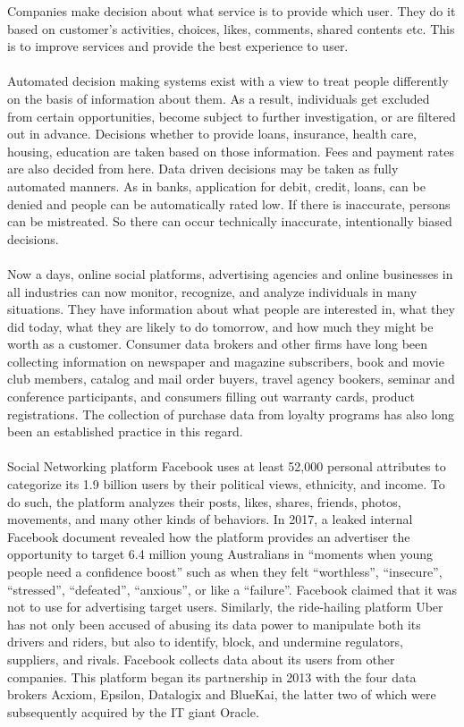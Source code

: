 \documentclass[12pt,a4paper,conference]{IEEEtran}
\begin{document}
Companies make decision about what service is to provide which user. They do it based on customer’s activities, choices, likes, comments, shared contents etc. This is to improve services and provide the best experience to user. \\
\\
Automated decision making systems exist with a view to treat people differently on the basis of information about them. As a result, individuals get excluded from certain opportunities, become subject to further investigation, or are filtered out in advance. Decisions whether to provide loans, insurance, health care, housing, education are taken based on those information. Fees and payment rates are also decided from here. \autocite{valentino2012websites} Data driven decisions may be taken as fully automated manners. As in banks, application for debit, credit, loans, can be denied and people can be automatically rated low. If there is inaccurate, persons can be mistreated. So there can occur technically inaccurate, intentionally biased decisions. \\
\\
Now a days, online social platforms, advertising agencies and online businesses in all industries can now monitor, recognize, and analyze individuals in many situations. They have information about what people are interested in, what they did today, what they are likely to do tomorrow, and how much they might be worth as a customer. Consumer data brokers and other firms have long been collecting information on newspaper and magazine subscribers, book and movie club members, catalog and mail order buyers, travel agency bookers, seminar and conference participants, and consumers filling out warranty cards, product registrations. The collection of purchase data from loyalty programs has also long been an established practice in this regard. \\
\\
Social Networking platform Facebook uses at least 52,000 personal attributes to categorize its 1.9 billion users by their political views, ethnicity, and income. To do such, the platform analyzes their posts, likes, shares, friends, photos, movements, and many other kinds of behaviors. In 2017, a leaked internal Facebook document revealed how the platform provides an advertiser the opportunity to target 6.4 million young Australians in “moments when young people need a confidence boost” such as when they felt “worthless”, “insecure”, “stressed”, “defeated”, “anxious”, or like a “failure”\autocite{tiku2017get}. Facebook claimed that it was not to use for advertising target users.  Similarly, the ride-hailing platform Uber has not only been accused of abusing its data power to manipulate both its drivers and riders, but also to identify, block, and undermine regulators, suppliers, and rivals. \autocite{calo2017taking} Facebook collects data about its users from other companies. This platform began its partnership in 2013 with the four data brokers Acxiom, Epsilon, Datalogix and BlueKai, the latter two of which were subsequently acquired by the IT giant Oracle.\\
\end{document}
